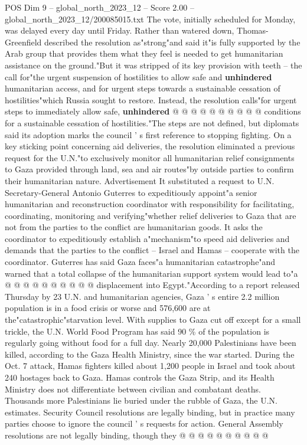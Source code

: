 \begin{textsample}{POS Dim 9 – global\_north\_2023\_12 – Score 2.00 – global\_north\_2023\_12/200085015.txt}
The vote, initially scheduled for Monday, was delayed every day until Friday.
Rather than watered down, Thomas-Greenfield described the resolution as"strong"and said it"is fully supported by the Arab group that provides them what they feel is needed to get humanitarian assistance on the ground."But it was stripped of its key provision with teeth -- the call for"the urgent suspension of hostilities to allow safe and \textbf{unhindered} humanitarian access, and for urgent steps towards a sustainable cessation of hostilities"which Russia sought to restore.
Instead, the resolution calls"for urgent steps to immediately allow safe, \textbf{unhindered} @ @ @ @ @ @ @ @ @ @ conditions for a sustainable cessation of hostilities."The steps are not defined, but diplomats said its adoption marks the council ' s first reference to stopping fighting.
On a key sticking point concerning aid deliveries, the resolution eliminated a previous request for the U.N."to exclusively monitor all humanitarian relief consignments to Gaza provided through land, sea and air routes"by outside parties to confirm their humanitarian nature.
Advertisement It substituted a request to U.N.
Secretary-General Antonio Guterres to expeditiously appoint"a senior humanitarian and reconstruction coordinator with responsibility for facilitating, coordinating, monitoring and verifying"whether relief deliveries to Gaza that are not from the parties to the conflict are humanitarian goods.
It asks the coordinator to expeditiously establish a"mechanism"to speed aid deliveries and demands that the parties to the conflict -- Israel and Hamas -- cooperate with the coordinator.
Guterres has said Gaza faces"a humanitarian catastrophe"and warned that a total collapse of the humanitarian support system would lead to"a @ @ @ @ @ @ @ @ @ @ displacement into Egypt."According to a report released Thursday by 23 U.N. and humanitarian agencies, Gaza ' s entire 2.2 million population is in a food crisis or worse and 576,600 are at the"catastrophic"starvation level.
With supplies to Gaza cut off except for a small trickle, the U.N.
World Food Program has said 90 \% of the population is regularly going without food for a full day.
Nearly 20,000 Palestinians have been killed, according to the Gaza Health Ministry, since the war started.
During the Oct. 7 attack, Hamas fighters killed about 1,200 people in Israel and took about 240 hostages back to Gaza.
Hamas controls the Gaza Strip, and its Health Ministry does not differentiate between civilian and combatant deaths.
Thousands more Palestinians lie buried under the rubble of Gaza, the U.N. estimates.
Security Council resolutions are legally binding, but in practice many parties choose to ignore the council ' s requests for action.
General Assembly resolutions are not legally binding, though they @ @ @ @ @ @ @ @ @ @

\end{textsample}

